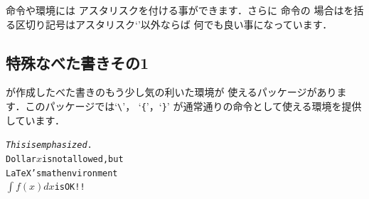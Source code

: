 {命令や環境には
アスタリスクを付ける事ができます．さらに 命令の
場合はを括る区切り記号はアスタリスク`\str*'以外ならば
何でも良い事になっています．%


\subsection{特殊なべた書きその1\zdash{}}
が作成したべた書きのもう少し気の利いた環境が
使えるパッケージがあります．このパッケージでは`\verb|\|'，
`\verb|{|'，`\verb|}|' が通常通りの命令として使える環境を提供
しています．
\begin{InOut}
\usepackage{alltt} 
\begin{alltt}
{\em This is emphasized}.
Dollar $x$ is not allowed, but 
{\LaTeX's} math environment 
\(\int f(x)dx\) is OK!!
\end{alltt}
\end{InOut}

}

